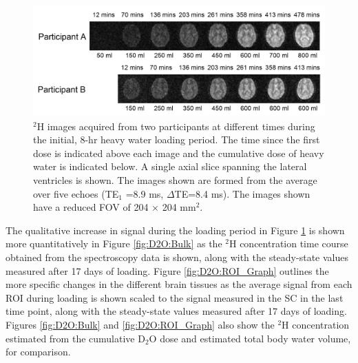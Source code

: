 \documentclass[class=article, crop=false]{standalone}
\begin{document}
\begin{figure}
    \centering
    \includegraphics[width=1\textwidth]{Figures/D2O/Loading.png}
    \caption{$^2$H images acquired from two participants at different times during the initial, 8-hr heavy water loading period. The time since the first dose is indicated above each image and the cumulative dose of heavy water is indicated below. A single axial slice spanning the lateral ventricles is shown. The images shown are formed from the average over five echoes (TE$_1$ =8.9 ms, $\Delta$TE=8.4 ms). The images shown have a reduced FOV of 204 × 204 mm$^2$.}
    \label{fig:D2O:Load}
\end{figure}

The qualitative increase in signal during the loading period in Figure \ref{fig:D2O:Load} is shown more quantitatively in Figure \ref{fig:D2O:Bulk} as the $^2$H concentration time course obtained from the spectroscopy data is shown, along with the steady-state values measured after 17 days of loading. Figure \ref{fig:D2O:ROI_Graph} outlines the more specific changes in the different brain tissues as the average signal from each ROI during loading is shown scaled to the signal measured in the SC in the last time point, along with the steady-state values measured after 17 days of loading. Figures \ref{fig:D2O:Bulk} and \ref{fig:D2O:ROI_Graph} also show the $^2$H concentration estimated from the cumulative D$_2$O dose and estimated total body water volume, for comparison. 
\end{document}
